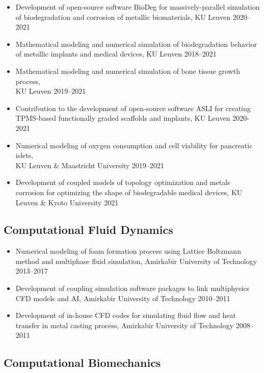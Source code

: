 \documentclass{cv}
\begin{document}
\begin{itemize}
\item
Development of open-source software BioDeg for massively-parallel simulation of biodegradation and corrosion of metallic biomaterials, {KU Leuven} \hfill 2020--2021
\item
Mathematical modeling and numerical simulation of biodegradation behavior of metallic implants and medical devices, {KU Leuven} \hfill 2018--2021
\item
Mathematical modeling and numerical simulation of bone tissue growth process, \\{KU Leuven} \hfill 2019--2021
\item 
Contribution to the development of open-source software ASLI for creating TPMS-based functionally graded scaffolds and implants, KU Leuven \hfill 2020-2021
\item
Numerical modeling of oxygen consumption and cell viability for pancreatic islets, \\{KU Leuven \& Maastricht University} \hfill 2019--2021
\item
Development of coupled models of topology optimization and metals corrosion for optimizing the shape of biodegradable medical devices, {KU Leuven \& Kyoto University} \hfill 2021
\end{itemize}

\subsection{Computational Fluid Dynamics}

\begin{itemize}
\item
Numerical modeling of foam formation process using Lattice Boltzmann method and multiphase fluid simulation, {Amirkabir University of Technology} \hfill 2013--2017
\item
Development of coupling simulation software packages to link multiphysics CFD models and AI, {Amirkabir University of Technology} \hfill 2010--2011
\item
Development of in-house CFD codes for simulating fluid flow and heat transfer in metal casting process, {Amirkabir University of Technology} \hfill 2008--2011
\end{itemize}

\subsection{Computational Biomechanics}
\end{document}
